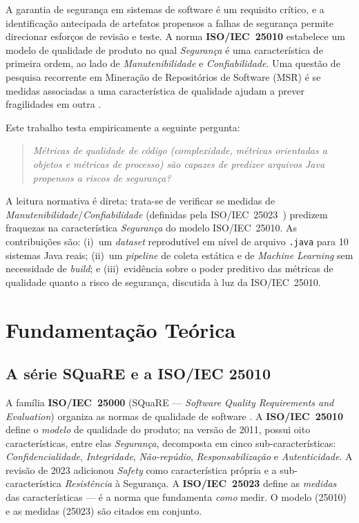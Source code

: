 \documentclass[12pt]{article}
\begin{document}
A garantia de segurança em sistemas de software é um requisito crítico, e a
identificação antecipada de artefatos propensos a falhas de segurança permite
direcionar esforços de revisão e teste. A norma \textbf{ISO/IEC~25010}
\cite{iso25010} estabelece um modelo de qualidade de produto no qual
\emph{Segurança} é uma característica de primeira ordem, ao lado de
\emph{Manutenibilidade} e \emph{Confiabilidade}. Uma questão de pesquisa
recorrente em Mineração de Repositórios de Software (MSR) é se medidas associadas
a uma característica de qualidade ajudam a prever fragilidades em outra
\cite{shin2011,zimmermann2010}.

Este trabalho testa empiricamente a seguinte pergunta:

\begin{quote}
\textit{Métricas de qualidade de código (complexidade, métricas orientadas a
objetos e métricas de processo) são capazes de predizer arquivos Java propensos
a riscos de segurança?}
\end{quote}

A leitura normativa é direta: trata-se de verificar se medidas de
\emph{Manutenibilidade}/\emph{Confiabilidade} (definidas pela
ISO/IEC~25023~\cite{iso25023}) predizem fraquezas na característica
\emph{Segurança} do modelo ISO/IEC~25010. As contribuições são: (i)~um
\textit{dataset} reprodutível em nível de arquivo \texttt{.java} para 10
sistemas Java reais; (ii)~um \textit{pipeline} de coleta estática e de
\textit{Machine Learning} sem necessidade de \textit{build}; e (iii)~evidência
sobre o poder preditivo das métricas de qualidade quanto a risco de segurança,
discutida à luz da ISO/IEC~25010.

\section{Fundamentação Teórica}

\subsection{A série SQuaRE e a ISO/IEC 25010}
A família \textbf{ISO/IEC~25000} (SQuaRE --- \textit{Software Quality
Requirements and Evaluation}) organiza as normas de qualidade de software
\cite{iso25000}. A \textbf{ISO/IEC~25010} \cite{iso25010} define o \emph{modelo}
de qualidade do produto; na versão de 2011, possui oito características, entre
elas \emph{Segurança}, decomposta em cinco sub-características:
\emph{Confidencialidade}, \emph{Integridade}, \emph{Não-repúdio},
\emph{Responsabilização} e \emph{Autenticidade}. A revisão de 2023 adicionou
\emph{Safety} como característica própria e a sub-característica
\emph{Resistência} à Segurança. A \textbf{ISO/IEC~25023} \cite{iso25023}
define as \emph{medidas} das características --- é a norma que fundamenta
\emph{como} medir. O modelo (25010) e as medidas (25023) são citados em conjunto.
\end{document}
